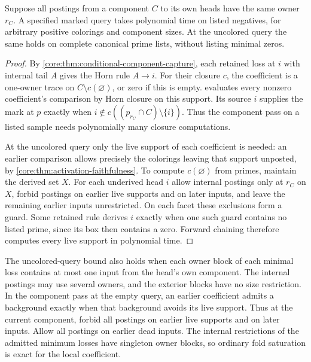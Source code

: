 \begin{corollary}
\label{core:cor:component-owner-marks}
Suppose all postings from a component $C$ to its own heads have
the same owner $r_C$. A specified marked query takes polynomial
time on listed negatives, for arbitrary positive colorings and
component sizes. At the uncolored query the same holds on complete
canonical prime lists, without listing minimal zeros.
\end{corollary}
\begin{proof}
By \cref{core:thm:conditional-component-capture}, each retained
loss at $i$ with internal tail $A$ gives the Horn rule $A\to i$.
For their closure $c$, the coefficient is a one-owner trace on
$C\setminus c(\varnothing)$, or zero if this is empty.
 evaluates every nonzero
coefficient's comparison by Horn closure on this support. Its
source $i$ supplies the mark at $p$ exactly when
$i\notin c((p_{r_C}\cap C)\setminus\{i\})$. Thus the component pass on a listed
sample needs polynomially many closure computations.

At the uncolored query only the live support of each coefficient is
needed: an earlier comparison allows precisely the colorings leaving
that support unposted, by \cref{core:thm:activation-faithfulness}.
To compute $c(\varnothing)$ from primes, maintain the derived set $X$.
For each underived head $i$ allow internal postings only at $r_C$
on $X$, forbid postings on earlier live supports and on later inputs,
and leave the remaining earlier inputs unrestricted. On each facet
these exclusions form a guard. Some retained rule derives $i$
exactly when one such guard contains no listed prime, since its box
then contains a zero. Forward chaining therefore computes every
live support in polynomial time.
\end{proof}

The uncolored-query bound also holds when each owner
block of each minimal loss contains at most one input
from the head's own component. The internal postings
may use several owners, and the exterior blocks have
no size restriction. In the component pass at the empty
query, an earlier coefficient admits a background
exactly when that background avoids its live support.
Thus at the current component, forbid all postings on
earlier live supports and on later inputs. Allow all
postings on earlier dead inputs. The internal
restrictions of the admitted minimum losses have
singleton owner blocks, so ordinary fold saturation
is exact for the local coefficient.

